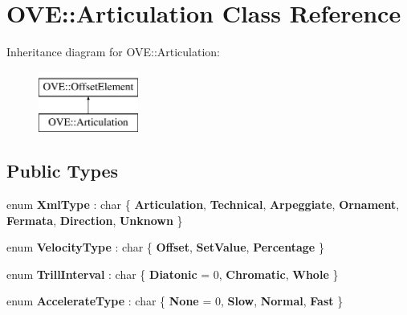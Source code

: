 \hypertarget{class_o_v_e_1_1_articulation}{}\section{O\+VE\+:\+:Articulation Class Reference}
\label{class_o_v_e_1_1_articulation}
Inheritance diagram for O\+VE\+:\+:Articulation\+:\begin{figure}[H]
\begin{center}
\leavevmode
\includegraphics[height=2.000000cm]{class_o_v_e_1_1_articulation}
\end{center}
\end{figure}
\subsection*{Public Types}
\begin{DoxyCompactItemize}
\item 
\mbox{\label{class_o_v_e_1_1_articulation_a2d308ddbef8cc855d71af7cfefdd911e}} 
enum {\bfseries Xml\+Type} \+: char \{ \newline
{\bfseries Articulation}, 
{\bfseries Technical}, 
{\bfseries Arpeggiate}, 
{\bfseries Ornament}, 
\newline
{\bfseries Fermata}, 
{\bfseries Direction}, 
{\bfseries Unknown}
 \}
\item 
\mbox{\label{class_o_v_e_1_1_articulation_a78be8ac9503252af160d91531c7dc8f4}} 
enum {\bfseries Velocity\+Type} \+: char \{ {\bfseries Offset}, 
{\bfseries Set\+Value}, 
{\bfseries Percentage}
 \}
\item 
\mbox{\label{class_o_v_e_1_1_articulation_ad3c638363c18c09d32962fd834cf62a3}} 
enum {\bfseries Trill\+Interval} \+: char \{ {\bfseries Diatonic} = 0, 
{\bfseries Chromatic}, 
{\bfseries Whole}
 \}
\item 
\mbox{\label{class_o_v_e_1_1_articulation_a9709538ecba0a179d250df6c18762c6a}} 
enum {\bfseries Accelerate\+Type} \+: char \{ {\bfseries None} = 0, 
{\bfseries Slow}, 
{\bfseries Normal}, 
{\bfseries Fast}
 \}
\end{DoxyCompactItemize}
